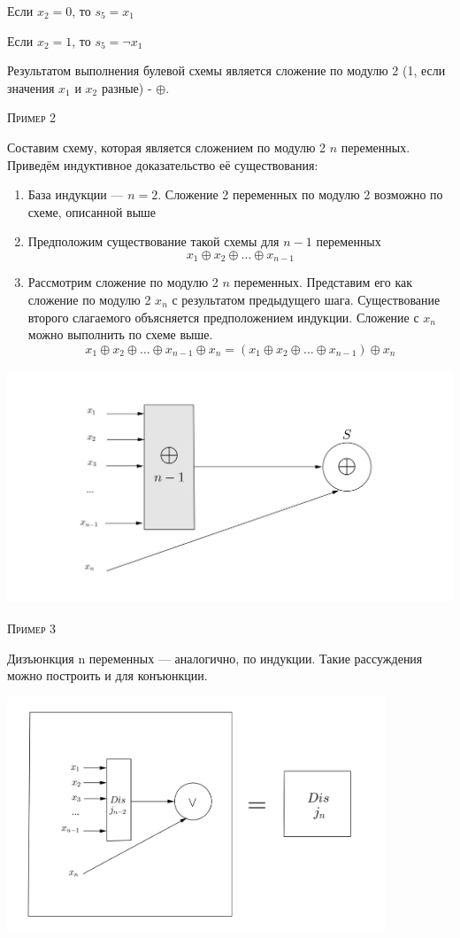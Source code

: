 ﻿\documentclass[a4paper, 12pt]{article}
\begin{document}
 Если $x_2 = 0$, то $s_5 = x_1$
  
 Если $x_2 = 1$, то $s_5 = \lnot x_1$
 
 Результатом выполнения булевой схемы является сложение по модулю 2 (1, если значения $x_1$ и $x_2$ разные) - $\oplus$.
 
 \textsc{Пример 2}
 
 Составим схему, которая является сложением по модулю 2 $n$ переменных. Приведём индуктивное доказательство её существования: 
 
 \begin{enumerate}
     \item База индукции --- $n = 2$. Сложение 2 переменных по модулю 2 возможно по схеме, описанной выше
     \item Предположим существование такой схемы для $n - 1$ переменных 
     \[x_1 \oplus x_2 \oplus \ldots \oplus x_{n-1}\]
     \item Рассмотрим сложение по модулю 2 $n$ переменных. Представим его как сложение по модулю 2 $x_n$ с результатом предыдущего шага. Существование второго слагаемого объясняется предположением индукции. Сложение с $x_n$ можно выполнить по схеме выше. 
     \[x_1 \oplus x_2 \oplus \ldots \oplus x_{n-1} \oplus x_n = (x_1 \oplus x_2 \oplus \ldots \oplus x_{n-1}) \oplus x_n\]
 \end{enumerate}
\includegraphics[height=7cm]{images/2.png}
 
 \textsc{Пример 3}
 
 Дизъюнкция n переменных --- аналогично, по индукции. Такие рассуждения можно построить и для конъюнкции.
 
 \includegraphics[height=7cm]{images/3.png}
 
\end{document}
